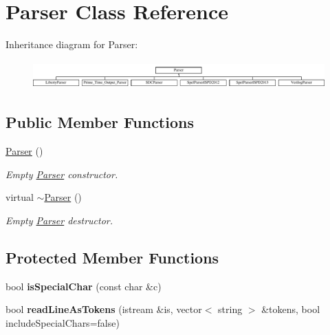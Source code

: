 \hypertarget{classParser}{\section{Parser Class Reference}
\label{classParser}
}
Inheritance diagram for Parser\-:\begin{figure}[H]
\begin{center}
\leavevmode
\includegraphics[height=1.072797cm]{classParser}
\end{center}
\end{figure}
\subsection*{Public Member Functions}
\begin{DoxyCompactItemize}
\item 
\hypertarget{classParser_a12234f6cd36b61af4b50c94a179422c1}{\hyperlink{classParser_a12234f6cd36b61af4b50c94a179422c1}{Parser} ()}\label{classParser_a12234f6cd36b61af4b50c94a179422c1}

\begin{DoxyCompactList}\small\item\em Empty \hyperlink{classParser}{Parser} constructor. \end{DoxyCompactList}\item 
\hypertarget{classParser_ad576b92b9cc324f6f41b0269a9a1a546}{virtual \hyperlink{classParser_ad576b92b9cc324f6f41b0269a9a1a546}{$\sim$\-Parser} ()}\label{classParser_ad576b92b9cc324f6f41b0269a9a1a546}

\begin{DoxyCompactList}\small\item\em Empty \hyperlink{classParser}{Parser} destructor. \end{DoxyCompactList}\end{DoxyCompactItemize}
\subsection*{Protected Member Functions}
\begin{DoxyCompactItemize}
\item 
\hypertarget{classParser_a83c7ac58f2c98cc54e9c750b29e6b0f0}{bool {\bfseries is\-Special\-Char} (const char \&c)}\label{classParser_a83c7ac58f2c98cc54e9c750b29e6b0f0}

\item 
\hypertarget{classParser_ae42067f51acd49ccccb0b0373321a421}{bool {\bfseries read\-Line\-As\-Tokens} (istream \&is, vector$<$ string $>$ \&tokens, bool include\-Special\-Chars=false)}\label{classParser_ae42067f51acd49ccccb0b0373321a421}

\end{DoxyCompactItemize}

